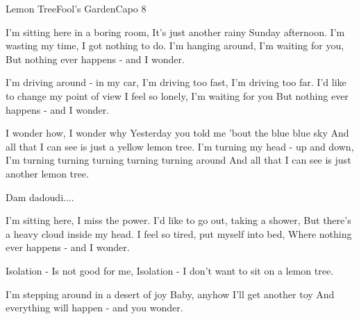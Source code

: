 \begin{song}{Lemon Tree}{Fool's Garden}{Capo 8}


I'm sitting here in a boring room,
It's just another rainy Sunday afternoon.
I'm wasting my time, I got nothing to do.
I'm hanging around, I'm waiting for you,
But nothing ever happens - and I wonder.

I'm driving around - in my car,
I'm driving too fast, I'm driving too far.
I'd like to change my point of view
I feel so lonely, I'm waiting for you
But nothing ever happens - and I wonder.

I wonder how, I wonder why
Yesterday you told me 'bout the blue blue sky
And all that I can see is just a yellow lemon tree.
I'm turning my head - up and down,
I'm turning turning turning turning turning around
And all that I can see is just another lemon tree.

Dam     dadoudi....

I'm sitting here, I miss the power.
I'd like to go out, taking a shower,
But there's a heavy cloud inside my head.
I feel so tired, put myself into bed,
Where nothing ever happens - and I wonder.

Isolation - Is not good for me,
Isolation - I don't want to sit on a lemon tree.

I'm stepping around in a desert of joy
Baby, anyhow I'll get another toy
And everything will happen - and you wonder.


\end{song}
